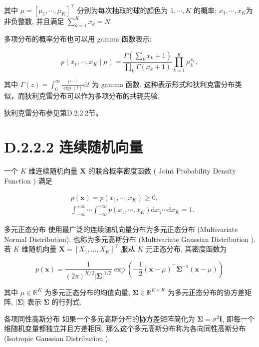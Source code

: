 \documentclass[10pt]{article}
\begin{document}
其中 $\mu=\left[\mu_{1}, \cdots, \mu_{K}\right]^{\top}$ 分别为每次抽取的球的颜色为 $1, \cdots, K$ 的概率; $x_{1}, \cdots, x_{K}$为非负整数, 并且满足 $\sum_{k=1}^{K} x_{k}=N$.

多项分布的概率分布也可以用 gamma 函数表示:


\begin{equation*}
p\left(x_{1}, \cdots, x_{K} \mid \mu\right)=\frac{\Gamma\left(\sum_{k} x_{k}+1\right)}{\prod_{k} \Gamma\left(x_{k}+1\right)} \prod_{k=1}^{K} \mu_{k}^{x_{k}}, \tag{D.19}
\end{equation*}


其中 $\Gamma(z)=\int_{0}^{\infty} \frac{t^{z-1}}{\exp (t)} \mathrm{d} t$ 为 gamma 函数. 这种表示形式和狄利克雷分布类似，而狄利克雷分布可以作为多项分布的共轭先验.

狄利克雷分布参见第D.2.2.2节。

\section*{D.2.2.2 连续随机向量}
一个 $K$ 维连续随机向量 $\boldsymbol{X}$ 的联合概率密度函数 ( Joint Probability Density Function ) 满足

$$
\begin{aligned}
& p(\boldsymbol{x})=p\left(x_{1}, \cdots, x_{K}\right) \geq 0, \\
& \int_{-\infty}^{+\infty} \cdots \int_{-\infty}^{+\infty} p\left(x_{1}, \cdots, x_{K}\right) \mathrm{d} x_{1} \cdots \mathrm{d} x_{K}=1 .
\end{aligned}
$$

多元正态分布 使用最广泛的连续随机向量分布为多元正态分布 (Multivariate Normal Distribution), 也称为多元高斯分布 (Multivariate Gaussian Distribution ). 若 $K$ 维随机向量 $\boldsymbol{X}=\left[X_{1}, \ldots, X_{K}\right]^{\top}$ 服从 $K$ 元正态分布, 其密度函数为


\begin{equation*}
p(\boldsymbol{x})=\frac{1}{(2 \pi)^{K / 2}|\boldsymbol{\Sigma}|^{1 / 2}} \exp \left(-\frac{1}{2}(\boldsymbol{x}-\mu)^{\top} \boldsymbol{\Sigma}^{-1}(\boldsymbol{x}-\mu)\right) \tag{D.22}
\end{equation*}


其中 $\mu \in \mathbb{R}^{K}$ 为多元正态分布的均值向量, $\boldsymbol{\Sigma} \in \mathbb{R}^{K \times K}$ 为多元正态分布的协方差矩阵, $|\boldsymbol{\Sigma}|$ 表示 $\boldsymbol{\Sigma}$ 的行列式.

各项同性高斯分布 如果一个多元高斯分布的协方差矩阵简化为 $\boldsymbol{\Sigma}=\sigma^{2} \boldsymbol{I}$, 即每一个维随机变量都独立并且方差相同, 那么这个多元高斯分布称为各向同性高斯分布 (Isotropic Gaussian Distribution ).
\end{document}
